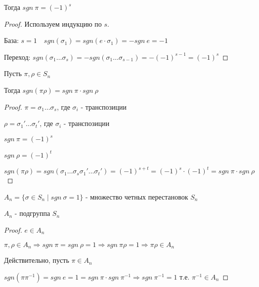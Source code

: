 Тогда $sgn \ \pi = (-1)^s$

\begin{proof}
    Используем индукцию по $s$.

    База: $s = 1 \quad sgn(\sigma_1) = sgn(e \cdot \sigma_1) = -sgn \ e = -1$

    Переход: $sgn(\sigma_1 \dots \sigma_s) = -sgn(\sigma_1 \dots \sigma_{s-1}) = -(-1)^{s-1} = (-1)^s$
\end{proof}

\begin{theorem2}
    Пусть $\pi, \rho \in S_n$

    Тогда $sgn(\pi \rho) = sgn \ \pi \cdot sgn \ \rho$

    \begin{proof} \quad 

        $\pi = \sigma_1 \dots \sigma_s$, где $\sigma_i$ - транспозиции

        $\rho = \sigma_1' \dots \sigma_t'$, где $\sigma_i$ - транспозиции

        $sgn \ \pi = (-1)^s$

        $sgn \ \rho = (-1)^t$

        $sgn(\pi \rho) = sgn(\sigma_1 \dots \sigma_s \sigma_1' \dots \sigma_t') =
        (-1)^{s+t} = (-1)^s \cdot (-1)^t = sgn \ \pi \cdot sgn \ \rho$
    \end{proof}
\end{theorem2}

\begin{theorem-non}
    $A_n = \{ \sigma \in S_n \mid sgn \ \sigma = 1 \}$ - множество четных перестановок $S_n$

    $A_n$ - подгруппа $S_n$

    \begin{proof}
        $e \in A_n$

        $\pi, \rho \in A_n \Longrightarrow sgn \ \pi = sgn \ \rho = 1 \Longrightarrow sgn \ \pi \rho = 1 
        \Longrightarrow \pi \rho \in A_n$

        Действительно, пусть $\pi \in A_n$

        $sgn(\pi \pi^{-1}) = sgn \ e = 1 = sgn \ \pi \cdot sgn \ \pi^{-1}
        \Longrightarrow sgn \ \pi^{-1} = 1$ т.е. $\pi^{-1} \in A_n$
    \end{proof}
\end{theorem-non}

